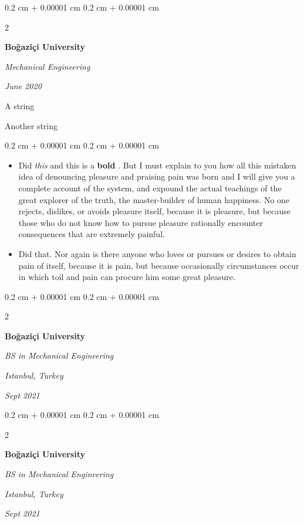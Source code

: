\documentclass[10pt, letterpaper]{article}
\newenvironment{summary}{
    \begin{description}[
        topsep=0.10 cm,
        parsep=0.10 cm,
        partopsep=0pt,
        itemsep=0pt,
        leftmargin=0.4 cm + 10pt
    ]
}{
    \end{description}
} %
\newenvironment{highlights}{
    \begin{itemize}[
        topsep=0.10 cm,
        parsep=0.10 cm,
        partopsep=0pt,
        itemsep=0pt,
        leftmargin=0.4 cm + 10pt
    ]
}{
    \end{itemize}
} %
\newenvironment{onecolentry}{
    \begin{adjustwidth}{
        0.2 cm + 0.00001 cm
    }{
        0.2 cm + 0.00001 cm
    }
}{
    \end{adjustwidth}
} %
\newenvironment{twocolentry}[2][]{
    \onecolentry
    \def\secondColumn{#2}
    \setcolumnwidth{\fill, 4.5 cm}
    \begin{paracol}{2}
}{
    \switchcolumn \raggedleft \secondColumn
    \end{paracol}
    \endonecolentry
} %
\let\hrefWithoutArrow\href
\renewcommand{\href}[2]{\hrefWithoutArrow{#1}{\ifthenelse{\equal{#2}{}}{ }{#2 }\raisebox{.15ex}{\footnotesize \faExternalLink*}}}
\begin{document}
        \begin{twocolentry}{
            
            
        \textit{June 2020}}
            \textbf{Boğaziçi University}

            \textit{Mechanical Engineering}
        \end{twocolentry}
            \begin{summary}
                \item A string
                \item Another string
            \end{summary}
        \vspace{0.10 cm}
        \begin{onecolentry}
            \begin{highlights}
                \item Did \textit{this} and this is a \textbf{bold} \href{https://example.com}{link}. But I must explain to you how all this mistaken idea of denouncing pleasure and praising pain was born and I will give you a complete account of the system, and expound the actual teachings of the great explorer of the truth, the master-builder of human happiness. No one rejects, dislikes, or avoids pleasure itself, because it is pleasure, but because those who do not know how to pursue pleasure rationally encounter consequences that are extremely painful.
                \item Did that. Nor again is there anyone who loves or pursues or desires to obtain pain of itself, because it is pain, but because occasionally circumstances occur in which toil and pain can procure him some great pleasure.
            \end{highlights}
        \end{onecolentry}


        \vspace{0.2 cm}

        \begin{twocolentry}{
        \textit{Istanbul, Turkey}    
            
        \textit{Sept 2021}}
            \textbf{Boğaziçi University}

            \textit{BS in Mechanical Engineering}
        \end{twocolentry}


        \vspace{0.2 cm}

        \begin{twocolentry}{
        \textit{Istanbul, Turkey}    
            
        \textit{Sept 2021}}
            \textbf{Boğaziçi University}

            \textit{BS in Mechanical Engineering}
        \end{twocolentry}
\end{document}
